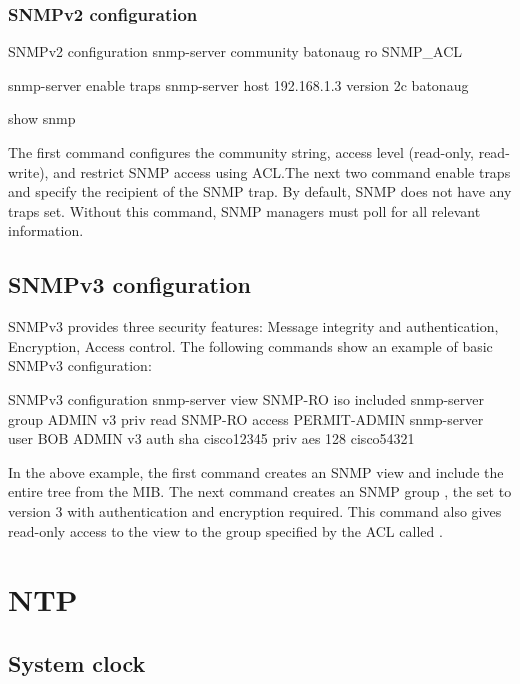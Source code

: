 \subsubsection{SNMPv2 configuration}

\begin{sexylisting}{SNMPv2 configuration}
snmp-server community batonaug ro SNMP_ACL

snmp-server enable traps
snmp-server host 192.168.1.3 version 2c batonaug

show snmp
\end{sexylisting}

The first command configures the community string, access level (read-only,  read-write), and restrict SNMP access using ACL.The next two command enable traps and specify the recipient of the SNMP trap. By default, SNMP does not have any traps set. Without this command, SNMP managers must poll for all relevant information.

\subsection{SNMPv3 configuration}

SNMPv3 provides three security features: Message integrity and authentication, Encryption, Access control. The following commands show an example of basic SNMPv3 configuration:

\begin{sexylisting}{SNMPv3 configuration}
snmp-server view SNMP-RO iso included                                    
snmp-server group ADMIN v3 priv read SNMP-RO access PERMIT-ADMIN         
snmp-server user BOB ADMIN v3 auth sha cisco12345 priv aes 128 cisco54321
\end{sexylisting}

In the above example, the first command creates an SNMP view  and include the entire  tree from the MIB. The next command creates an SNMP group , the set to version 3 with authentication and encryption required. This command also gives read-only access to the view  to the group specified by the ACL called . 

\section{NTP}

\subsection{System clock}

